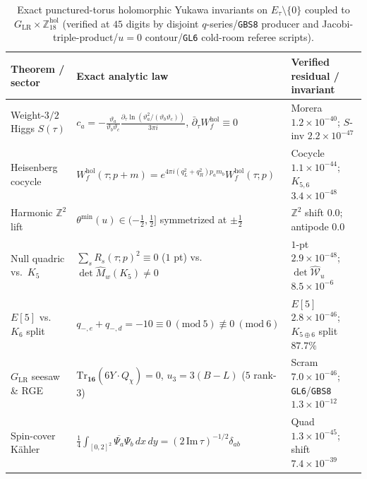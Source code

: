 \documentclass[aps,prd,twocolumn,nofootinbib,floatfix]{revtex4-2}
\begin{document}
\begin{table}[t]
\caption{Exact punctured-torus holomorphic Yukawa invariants on $E_\tau\setminus\{0\}$ coupled to $G_{\mathrm{LR}}\times\mathbb{Z}_{18}^{\mathrm{hol}}$ (verified at $45$ digits by disjoint $q$-series/\texttt{GBS8} producer and Jacobi-triple-product/$u=0$ contour/\texttt{GL6} cold-room referee scripts).}
\label{tab:flavor_link4}
\begin{ruledtabular}
\begin{tabular}{lll}
Theorem / sector & Exact analytic law & Verified residual / invariant \\
\hline
Weight-$3/2$ Higgs $S(\tau)$ & $c_a = -\frac{\vartheta_a}{\vartheta_b\vartheta_c}\frac{\partial_\tau\ln(\vartheta_a^2/(\vartheta_b\vartheta_c))}{3\pi i}$, $\bar{\partial}_\tau W_f^{\mathrm{hol}} \equiv 0$ & Morera $1.2\times 10^{-40}$; $S$-inv $2.2\times 10^{-47}$ \\
Heisenberg cocycle & $W_f^{\mathrm{hol}}(\tau;p+m) = e^{4\pi i(q_L^2+q_R^2)p_a m_b}W_f^{\mathrm{hol}}(\tau;p)$ & Cocycle $1.1\times 10^{-44}$; $K_{5,6}$ $3.4\times 10^{-48}$ \\
Harmonic $\mathbb{Z}^2$ lift & $\theta^{\mathrm{min}}(u) \in (-\frac{1}{2},\frac{1}{2}]$ symmetrized at $\pm\frac{1}{2}$ & $\mathbb{Z}^2$ shift $0.0$; antipode $0.0$ \\
Null quadric vs.\ $K_5$ & $\sum_s R_s(\tau;p)^2 \equiv 0$ ($1$ pt) vs.\ $\det\widehat{M}_w(K_5) \ne 0$ & $1$-pt $2.9\times 10^{-48}$; $\det\widehat{\mathcal{W}}_u$ $8.5\times 10^{-6}$ \\
$E[5]$ vs.\ $K_6$ split & $q_{-,e}+q_{-,d} = -10 \equiv 0\ (\mathrm{mod}\ 5) \not\equiv 0\ (\mathrm{mod}\ 6)$ & $E[5]$ $2.8\times 10^{-46}$; $K_{5\oplus 6}$ split $87.7\%$ \\
$G_{\mathrm{LR}}$ seesaw \& RGE & $\mathrm{Tr}_{\mathbf{16}}(6Y\cdot Q_\chi)=0$, $u_3 = 3(B-L)$ ($5$ rank-$3$) & Scram $7.0\times 10^{-46}$; \texttt{GL6}/\texttt{GBS8} $1.3\times 10^{-12}$ \\
Spin-cover K\"ahler & $\frac{1}{4}\int_{[0,2]^2}\overline{\Psi_a}\Psi_b\,dx\,dy = (2\,\mathrm{Im}\,\tau)^{-1/2}\delta_{ab}$ & Quad $1.3\times 10^{-45}$; shift $7.4\times 10^{-39}$ \\
\end{tabular}
\end{ruledtabular}
\end{table}
\end{document}
